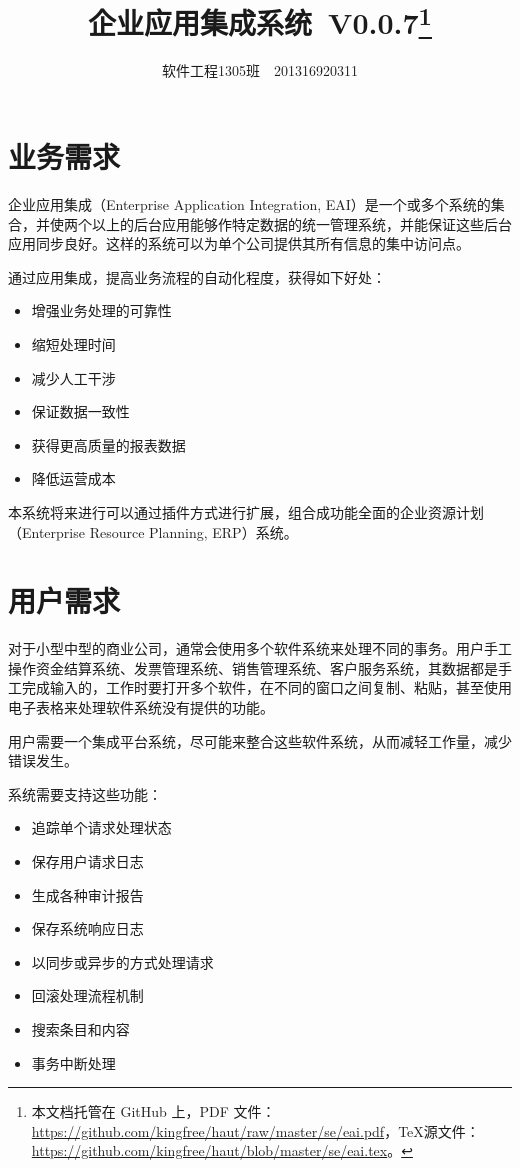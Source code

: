 \documentclass[cs4size,a4paper,nofonts]{ctexart}
\def\tjf{{\tt{田劲锋}}}
\def\titlec{企业应用集成系统}
\def\version{V0.0.7}
\begin{document}

\title{\bf\titlec~\version\footnote{本文档托管在 GitHub 上，PDF 文件：\url{https://github.com/kingfree/haut/raw/master/se/eai.pdf}，\TeX 源文件：\url{https://github.com/kingfree/haut/blob/master/se/eai.tex}。}}
\author{软件工程1305班~\quad\tjf\quad~201316920311}
\maketitle

\section{业务需求}

企业应用集成（Enterprise Application Integration, EAI）是一个或多个系统的集合，并使两个以上的后台应用能够作特定数据的统一管理系统，并能保证这些后台应用同步良好。这样的系统可以为单个公司提供其所有信息的集中访问点。

通过应用集成，提高业务流程的自动化程度，获得如下好处：

\begin{itemize}
\item 增强业务处理的可靠性
\item 缩短处理时间
\item 减少人工干涉
\item 保证数据一致性
\item 获得更高质量的报表数据
\item 降低运营成本
\end{itemize}

本系统将来进行可以通过插件方式进行扩展，组合成功能全面的企业资源计划（Enterprise Resource Planning, ERP）系统。

\section{用户需求}

对于小型中型的商业公司，通常会使用多个软件系统来处理不同的事务。用户手工操作资金结算系统、发票管理系统、销售管理系统、客户服务系统，其数据都是手工完成输入的，工作时要打开多个软件，在不同的窗口之间复制、粘贴，甚至使用电子表格来处理软件系统没有提供的功能。

用户需要一个集成平台系统，尽可能来整合这些软件系统，从而减轻工作量，减少错误发生。

系统需要支持这些功能：

\begin{itemize}
\item 追踪单个请求处理状态
\item 保存用户请求日志
\item 生成各种审计报告
\item 保存系统响应日志
\item 以同步或异步的方式处理请求
\item 回滚处理流程机制
\item 搜索条目和内容
\item 事务中断处理
\end{itemize}
\end{document}
